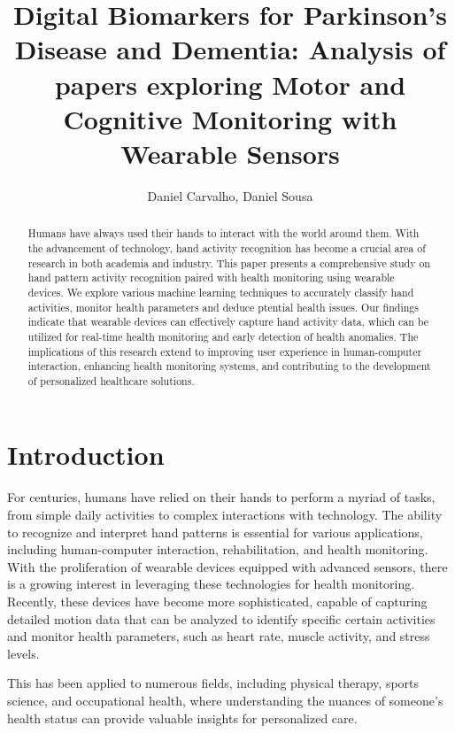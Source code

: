 \documentclass[sigconf,nonacm]{acmart}
\title{Digital Biomarkers for Parkinson’s Disease and Dementia: Analysis of papers exploring Motor and Cognitive Monitoring with Wearable Sensors}
\author{Daniel Carvalho, Daniel Sousa}
\affiliation{
  \institution{Faculdade de Ciências, Universidade de Lisboa}
  \city{Lisboa}
  \country{Portugal}
}
\begin{document}
\begin{abstract}
    Humans have always used their hands to interact with the world around them. With the advancement of technology, hand activity recognition has become a crucial area of research in both academia and industry. This paper presents a comprehensive study on hand pattern activity recognition paired with health monitoring using wearable devices. We explore various machine learning techniques to accurately classify hand activities, monitor health parameters and deduce ptential health issues. Our findings indicate that wearable devices can effectively capture hand activity data, which can be utilized for real-time health monitoring and early detection of health anomalies. The implications of this research extend to improving user experience in human-computer interaction, enhancing health monitoring systems, and contributing to the development of personalized healthcare solutions.
\end{abstract}


\maketitle

\section{Introduction}
    For centuries, humans have relied on their hands to perform a myriad of tasks, from simple daily activities to complex interactions with technology. The ability to recognize and interpret hand patterns is essential for various applications, including human-computer interaction, rehabilitation, and health monitoring. With the proliferation of wearable devices equipped with advanced sensors, there is a growing interest in leveraging these technologies for health monitoring. Recently, these devices have become more sophisticated, capable of capturing detailed motion data that can be analyzed to identify specific certain activities and monitor health parameters, such as heart rate, muscle activity, and stress levels.

    This has been applied to numerous fields, including physical therapy, sports science, and occupational health, where understanding the nuances of someone's health status can provide valuable insights for personalized care.
\end{document}
